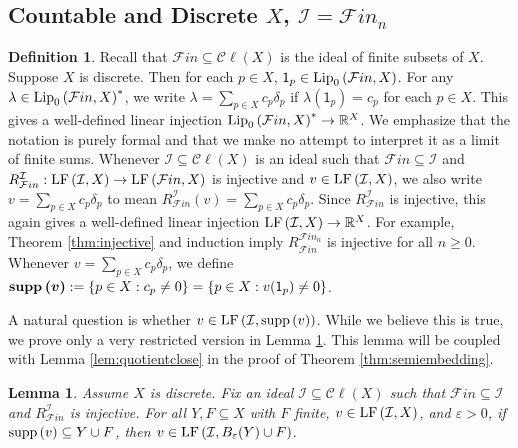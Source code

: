 \documentclass[12pt]{amsart}
\newtheorem{lemma}[theorem]{Lemma}
\theoremstyle{definition}
\newtheorem{definition}[theorem]{Definition}
\numberwithin{equation}{section}
\def \F {\mathcal{F}in}
\def \R {\mathbb{R}}
\def \I {\mathcal{I}}
\def \sbs {\subseteq}
\def \eps {\varepsilon}
\def \one {\mathsf{1}}
\newcommand{\Cl}[1]{\mathcal{C}\ell\left(#1\right)}
\begin{document}
\subsection{Countable and Discrete $X$, $\I = \F_n$}

\begin{definition}
Recall that $\F \sbs \Cl{X}$ is the ideal of finite subsets of $X$. Suppose $X$ is discrete. Then for each $p \in X$, $\one_p \in \Lip{\F}{X}$. For any $\lambda \in \Lip{\F}{X}^*$, we write $\lambda = \sum_{p \in X} c_p\delta_p$ if $\lambda(\one_p) = c_p$ for each $p \in X$. This gives a well-defined linear injection $\Lip{\F}{X}^* \to \R^{X}$. We emphasize that the notation is purely formal and that we make no attempt to interpret it as a limit of finite sums. Whenever $\I \sbs \Cl{X}$ is an ideal such that $\F \sbs \I$ and $R^\I_{\F}: \LF{\I}{X} \to \LF{\F}{X}$ is injective and $v \in \LF{\I}{X}$, we also write $v = \sum_{p \in X} c_p\delta_p$ to mean $R^\I_{\F}(v) = \sum_{p \in X} c_p\delta_p$. Since $R^\I_{\F}$ is injective, this again gives a well-defined linear injection $\LF{\I}{X} \to \R^X$. For example, Theorem \ref{thm:injective} and induction imply $R^{\F_n}_{\F}$ is injective for all $n \geq 0$. Whenever $v = \sum_{p \in X} c_p\delta_p$, we define $\boldsymbol{\supp{v}} := \{p \in X: c_p \neq 0\} = \{p \in X: v(\one_p) \neq 0\}$.
\end{definition}

A natural question is whether $v \in \LF{\I}{\supp{v}}$. While we believe this is true, we prove only a very restricted version in Lemma \ref{lem:supp}. This lemma will be coupled with Lemma \ref{lem:quotientclose} in the proof of Theorem \ref{thm:semiembedding}.

\begin{lemma} \label{lem:supp}
Assume $X$ is discrete. Fix an ideal $\I \sbs \Cl{X}$ such that $\F \sbs \I$ and $R^\I_{\F}$ is injective. For all $Y,F \sbs X$ with $F$ finite, $v \in \LF{\I}{X}$, and $\eps>0$, if $\supp{v} \sbs Y \cup F$, then $v \in \LF{\I}{B_{\eps}(Y) \cup F}$.
\end{lemma}
\end{document}
